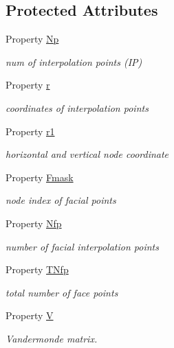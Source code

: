 \subsection*{Protected Attributes}
\begin{DoxyCompactItemize}
\item 
Property \hyperlink{class_std_prism_tri_ac04897b2b8836ed32b4929f5928b9440}{Np}
\begin{DoxyCompactList}\small\item\em num of interpolation points (IP) \end{DoxyCompactList}\item 
Property \hyperlink{class_std_prism_tri_aad8e1b11ac7552139fe6aacc8728b249}{r}
\begin{DoxyCompactList}\small\item\em coordinates of interpolation points \end{DoxyCompactList}\item 
Property \hyperlink{class_std_prism_tri_ac299edebe60f4004b8de0c402c40889e}{r1}
\begin{DoxyCompactList}\small\item\em horizontal and vertical node coordinate \end{DoxyCompactList}\item 
Property \hyperlink{class_std_prism_tri_a46904390f458a61845e1727b6458288f}{Fmask}
\begin{DoxyCompactList}\small\item\em node index of facial points \end{DoxyCompactList}\item 
Property \hyperlink{class_std_prism_tri_acaceb0774faf5c002381475a45575675}{Nfp}
\begin{DoxyCompactList}\small\item\em number of facial interpolation points \end{DoxyCompactList}\item 
Property \hyperlink{class_std_prism_tri_abd9ddf06a9024c8894dd9f4fbbafc169}{T\+Nfp}
\begin{DoxyCompactList}\small\item\em total number of face points \end{DoxyCompactList}\item 
Property \hyperlink{class_std_prism_tri_a2de460aab5349ff8fa131ce687f07f81}{V}
\begin{DoxyCompactList}\small\item\em Vandermonde matrix. \end{DoxyCompactList}\item 

\end{DoxyCompactItemize}
